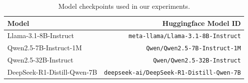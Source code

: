 \begin{table}[t]
\centering
\small
\caption{Model checkpoints used in our experiments.}
\label{tab:model_ckpts}
\begin{tabular}{lr}
\toprule
\rowcolor[HTML]{FFF2CC} \textbf{Model} & \textbf{Huggingface Model ID} \\
\midrule
Llama-3.1-8B-Instruct & \texttt{meta-llama/Llama-3.1-8B-Instruct}\\
Qwen2.5-7B-Instruct-1M & \texttt{Qwen/Qwen2.5-7B-Instruct-1M}\\
Qwen2.5-32B-Instruct & \texttt{Qwen/Qwen2.5-32B-Instruct}\\
DeepSeek-R1-Distill-Qwen-7B  & \texttt{deepseek-ai/DeepSeek-R1-Distill-Qwen-7B}\\
\bottomrule
\end{tabular}
\end{table}
